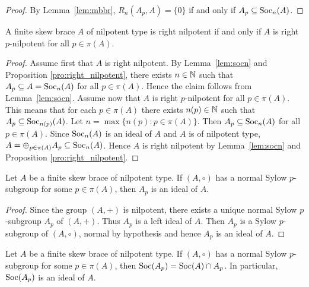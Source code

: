 \begin{proof}
    By Lemma~\ref{lem:mbbr}, %
    $R_n(A_p,A)=\{0\}$ if and only if $A_p\subseteq\operatorname{Soc}_n(A)$. 
\end{proof}


\begin{proposition}
    A finite skew brace $A$ of nilpotent type is right nilpotent if and only if $A$ is right $p$-nilpotent for all $p\in\pi(A)$. 
\end{proposition}

\begin{proof}
    Assume first that $A$ is right nilpotent. 
    By Lemma~\ref{lem:socn} and Proposition \ref{pro:right_nilpotent}, there exists $n\in\mathbb{N}$ such that $A_p\subseteq A=\operatorname{Soc}_n(A)$ for all $p\in\pi(A)$. Hence the claim follows from
    Lemma~\ref{lem:socn}. 
    Assume now
    that $A$ is right $p$-nilpotent for all $p\in\pi(A)$. This means
    that for each $p\in\pi(A)$ there exists $n(p)\in\mathbb{N}$ such that
    $A_p\subseteq\operatorname{Soc}_{n(p)}(A)$. Let 
    $n=\max\{n(p):p\in\pi(A)\}$. Then $A_p\subseteq\operatorname{Soc}_n(A)$ for all $p\in\pi(A)$. Since $\operatorname{Soc}_n(A)$ is an ideal
    of $A$ and $A$ is of nilpotent type, $A=\oplus_{p\in\pi(A)}A_p\subseteq\operatorname{Soc}_n(A)$. Hence $A$ is right nilpotent by Lemma~\ref{lem:socn} and Proposition \ref{pro:right_nilpotent}.
\end{proof}




\begin{lemma}
\label{lem:A_p:ideal}
    Let $A$ be a finite skew brace of nilpotent type. If $(A,\circ)$ has a normal
    Sylow $p$-subgroup for some $p\in\pi(A)$, then $A_p$ is an ideal of $A$.
\end{lemma}

\begin{proof}
   Since the group $(A,+)$ is nilpotent, there exists a unique normal Sylow $p$-subgroup $A_p$ of $(A,+)$. Thus $A_p$ is a left ideal of $A$. Then $A_p$ is a Sylow
   $p$-subgroup of $(A,\circ)$, normal by hypothesis and hence $A_p$ is an ideal of $A$. 
\end{proof}

\begin{lemma}
    \label{lem:Soc(A_p)}
    Let $A$ be a finite skew  brace of nilpotent type.
    If $(A,\circ)$ has a normal Sylow $p$-subgroup for some $p\in\pi(A)$, 
    then $\operatorname{Soc}(A_p)=\operatorname{Soc}(A)\cap A_p$. In particular, $\operatorname{Soc}(A_p)$ is an ideal of $A$.
\end{lemma}

